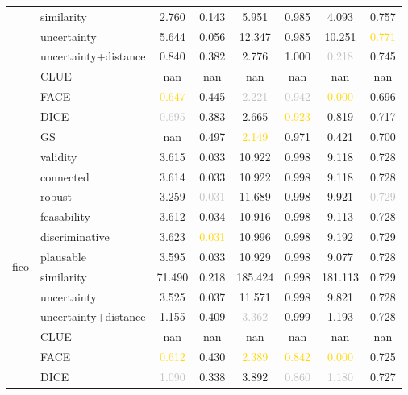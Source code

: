 \begin{table}[ht]
\begin{tabular}{l l c c c c c c}
 & similarity & 2.760 & 0.143 & 5.951 & 0.985 & 4.093 & 0.757 \\
 & uncertainty & 5.644 & 0.056 & 12.347 & 0.985 & 10.251 & \textcolor{gold}{0.771} \\
 & uncertainty+distance & \textcolor{bronze}{0.840} & 0.382 & 2.776 & 1.000 & \textcolor{silver}{0.218} & 0.745 \\
 & CLUE & nan & nan & nan & nan & nan & nan \\
 & FACE & \textcolor{gold}{0.647} & 0.445 & \textcolor{silver}{2.221} & \textcolor{silver}{0.942} & \textcolor{gold}{0.000} & 0.696 \\
 & DICE & \textcolor{silver}{0.695} & 0.383 & \textcolor{bronze}{2.665} & \textcolor{gold}{0.923} & 0.819 & 0.717 \\
 & GS & nan & 0.497 & \textcolor{gold}{2.149} & \textcolor{bronze}{0.971} & \textcolor{bronze}{0.421} & 0.700 \\
\hline
\multirow{13}{*}{fico} & validity & 3.615 & 0.033 & 10.922 & \textcolor{bronze}{0.998} & 9.118 & 0.728 \\
 & connected & 3.614 & 0.033 & 10.922 & \textcolor{bronze}{0.998} & 9.118 & 0.728 \\
 & robust & 3.259 & \textcolor{silver}{0.031} & 11.689 & \textcolor{bronze}{0.998} & 9.921 & \textcolor{silver}{0.729} \\
 & feasability & 3.612 & 0.034 & 10.916 & \textcolor{bronze}{0.998} & 9.113 & 0.728 \\
 & discriminative & 3.623 & \textcolor{gold}{0.031} & 10.996 & \textcolor{bronze}{0.998} & 9.192 & 0.729 \\
 & plausable & 3.595 & \textcolor{bronze}{0.033} & 10.929 & \textcolor{bronze}{0.998} & 9.077 & 0.728 \\
 & similarity & 71.490 & 0.218 & 185.424 & 0.998 & 181.113 & \textcolor{bronze}{0.729} \\
 & uncertainty & 3.525 & 0.037 & 11.571 & \textcolor{bronze}{0.998} & 9.821 & 0.728 \\
 & uncertainty+distance & \textcolor{bronze}{1.155} & 0.409 & \textcolor{silver}{3.362} & 0.999 & \textcolor{bronze}{1.193} & 0.728 \\
 & CLUE & nan & nan & nan & nan & nan & nan \\
 & FACE & \textcolor{gold}{0.612} & 0.430 & \textcolor{gold}{2.389} & \textcolor{gold}{0.842} & \textcolor{gold}{0.000} & 0.725 \\
 & DICE & \textcolor{silver}{1.090} & 0.338 & \textcolor{bronze}{3.892} & \textcolor{silver}{0.860} & \textcolor{silver}{1.180} & 0.727 \\

\end{tabular}
\end{table}
